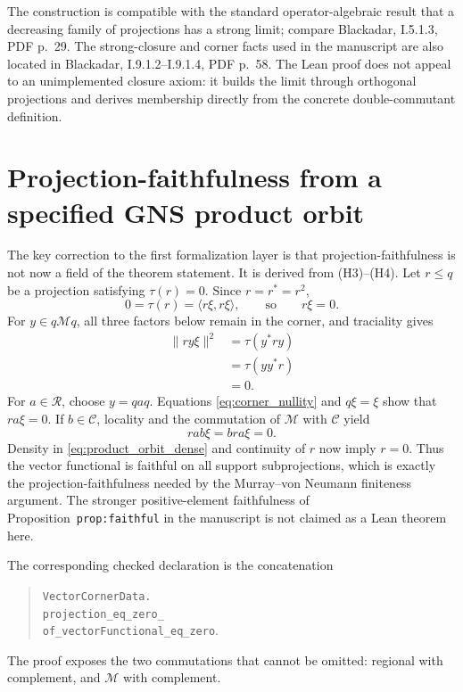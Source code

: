 \documentclass[11pt,reqno]{amsart}
\numberwithin{equation}{section}
\theoremstyle{definition}
\theoremstyle{remark}
\newcommand{\cM}{\mathcal M}
\newcommand{\cR}{\mathcal R}
\newcommand{\cC}{\mathcal C}
\begin{document}
The construction is compatible with the standard operator-algebraic result
that a decreasing family of projections has a strong limit; compare
Blackadar, I.5.1.3, PDF p.~29.  The strong-closure and corner facts used in
the manuscript are also located in Blackadar, I.9.1.2--I.9.1.4, PDF p.~58.
The Lean proof does not appeal to an unimplemented closure axiom: it builds
the limit through orthogonal projections and derives membership directly from
the concrete double-commutant definition.

\section{Projection-faithfulness from a specified GNS product orbit}
\label{sec:faithfulness}

The key correction to the first formalization layer is that
projection-faithfulness is not now a field of the theorem statement.  It is
derived from (H3)--(H4).
Let $r\leq q$ be a projection satisfying $\tau(r)=0$.  Since $r=r^*=r^2$,
\begin{equation}
  0=\tau(r)=\langle r\xi,r\xi\rangle,
  \qquad\text{so}\qquad r\xi=0.
  \label{eq:null_projection_annihilates_xi}
\end{equation}
For $y\in q\cM q$, all three factors below remain in the corner, and
traciality gives
\begin{equation}
  \begin{aligned}
    \lVert ry\xi\rVert^{2}
    &=\tau(y^*ry) \\
    &=\tau(yy^*r) \\
    &=0.
  \end{aligned}
  \label{eq:corner_nullity}
\end{equation}
For $a\in\cR$, choose $y=qaq$.  Equations
\eqref{eq:corner_nullity} and $q\xi=\xi$ show that $ra\xi=0$.  If
$b\in\cC$, locality and the commutation of $\cM$ with $\cC$ yield
\begin{equation}
  rab\xi=bra\xi=0.
  \label{eq:product_orbit_annihilation}
\end{equation}
Density in \eqref{eq:product_orbit_dense} and continuity of $r$ now imply
$r=0$.  Thus the vector functional is faithful on all support
subprojections, which is exactly the projection-faithfulness needed by the
Murray--von Neumann finiteness argument.  The stronger positive-element
faithfulness of Proposition~\texttt{prop:faithful} in the manuscript is not
claimed as a Lean theorem here.

The corresponding checked declaration is the concatenation
\begin{quote}\small
\texttt{VectorCornerData.}\\
\hspace*{1em}\texttt{projection\_eq\_zero\_}\\
\hspace*{1em}\texttt{of\_vectorFunctional\_eq\_zero}.
\end{quote}
The proof exposes the two commutations that cannot be omitted: regional with
complement, and $\cM$ with complement.
\end{document}
